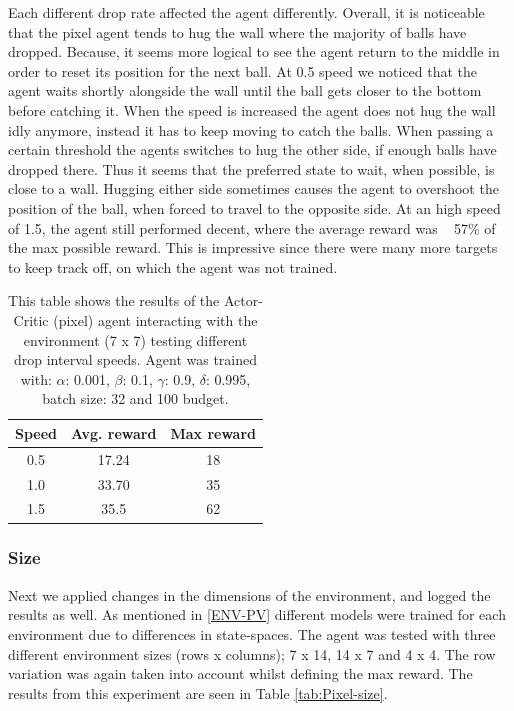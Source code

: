 \documentclass{article}
\begin{document}
Each different drop rate affected the agent differently. 
Overall, it is noticeable that the pixel agent tends to hug the wall where the majority of balls have dropped.
Because, it seems more logical to see the agent return to the middle in order to reset its position for the next ball.
At 0.5 speed we noticed that the agent waits shortly alongside the wall until the ball gets closer to the bottom before catching it. 
When the speed is increased the agent does not hug the wall idly anymore, instead it has to keep moving to catch the balls. 
When passing a certain threshold the agents switches to hug the other side, if enough balls have dropped there. 
Thus it seems that the preferred state to wait, when possible, is close to a wall. 
Hugging either side sometimes causes the agent to overshoot the position of the ball, when forced to travel to the opposite side. 
At an high speed of 1.5, the agent still performed decent, where the average reward was ~ 57\% of the max possible reward. 
This is impressive since there were many more targets to keep track off, on which the agent was not trained. 

\begin{table}[]
    \centering
    \begin{tabular}{|c|c|c|}
        \hline
        \textbf{Speed} & \textbf{Avg. reward} & \textbf{Max reward} \\
        \hline
        0.5   & 17.24       & 18                  \\
        1.0   & 33.70       & 35                  \\
        1.5   & 35.5        & 62          \\
        \hline          
    \end{tabular}
    \caption{This table shows the results of the Actor-Critic (pixel) agent interacting with the environment (7 x 7) testing different drop interval speeds.  Agent was trained with: $\alpha$: 0.001, $\beta$: 0.1, $\gamma$: 0.9, $\delta$: 0.995, batch size: 32 and 100 budget. }
    \label{tab:Pixel-speed}
\end{table}


\subsubsection{Size}
Next we applied changes in the dimensions of the environment, and logged the results as well.
As mentioned in \ref{ENV-PV} different models were trained for each environment due to differences in state-spaces. 
The agent was tested with three different environment sizes (rows x columns); 7 x 14, 14 x 7 and 4 x 4. 
The row variation was again taken into account whilst defining the max reward. 
The results from this experiment are seen in Table \ref{tab:Pixel-size}.
\end{document}
